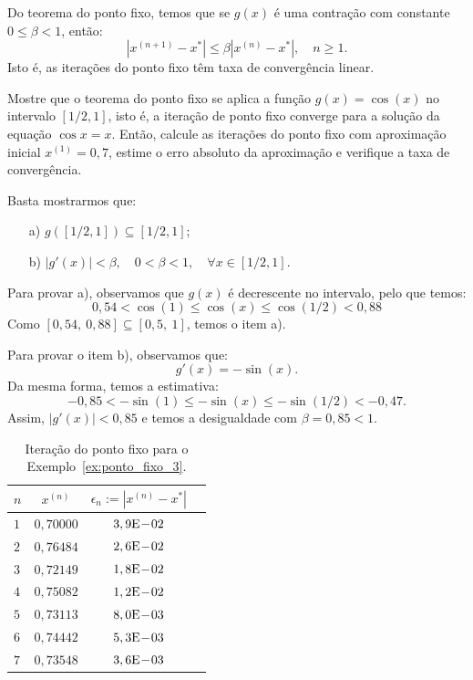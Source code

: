 \begin{ex}
\begin{obs}
  Do teorema do ponto fixo, temos que se $g(x)$ é uma contração com constante $0\leq \beta < 1$, então:
  \begin{equation}
    |x^{(n+1)}-x^*| \leq \beta |x^{(n)}-x^*|,\quad n\geq 1.
  \end{equation}
Isto é, as iterações do ponto fixo têm taxa de convergência linear.
\end{obs}

\begin{ex}\label{ex:ponto_fixo_3}
Mostre que o teorema do ponto fixo se aplica a função $g(x) = \cos(x)$ no intervalo $[1/2, 1]$, isto é, a iteração de ponto fixo converge para a solução da equação $\cos x = x$. Então, calcule as iterações do ponto fixo com aproximação inicial $x^{(1)} = 0,7$, estime o erro absoluto da aproximação e verifique a taxa de convergência.
\end{ex}
\begin{sol}
  Basta mostrarmos que:
  \begin{enumerate}
  \item[a)] $g\left([1/2,1]\right) \subseteq [1/2,1]$;
  \item[b)] $|g'(x)|<\beta, \quad 0<\beta<1,\quad \forall x\in [1/2,1]$.
  \end{enumerate}

Para provar a), observamos que $g(x)$ é decrescente no intervalo, pelo que temos:
\begin{equation}
  0,54<\cos(1)\leq \cos(x)\leq \cos(1/2)<0,88
\end{equation}
Como $[0,54,~0,88]\subseteq [0,5,~1]$, temos o item a).

Para provar o item b), observamos que:
\begin{equation}
  g'(x) = -\sin(x).
\end{equation}
Da mesma forma, temos a estimativa:
\begin{equation}
  -0,85<-\sin(1) \leq -\sin(x)\leq -\sin(1/2)<-0,47.
\end{equation}
Assim, $|g'(x)|<0,85$ e temos a desigualdade com $\beta=0,85<1$.

\begin{table}
  \centering
  \begin{tabular}{l|ccc}\hline
   $n$ & $x^{(n)}$ & $\epsilon_n := |x^{(n)} - x^*|$ \\\hline
   $1$ & $0,70000$ & $3,9\mathrm{E}\!-\!02$ \\
   $2$ & $0,76484$ & $2,6\mathrm{E}\!-\!02$ \\
   $3$ & $0,72149$ & $1,8\mathrm{E}\!-\!02$ \\
   $4$ & $0,75082$ & $1,2\mathrm{E}\!-\!02$ \\
   $5$ & $0,73113$ & $8,0\mathrm{E}\!-\!03$ \\
   $6$ & $0,74442$ & $5,3\mathrm{E}\!-\!03$ \\
   $7$ & $0,73548$ & $3,6\mathrm{E}\!-\!03$ \\\hline
  \end{tabular}
  \caption{Iteração do ponto fixo para o Exemplo~\ref{ex:ponto_fixo_3}.}
  \label{tab:ponto_fixo_3}
\end{table}



\end{sol}
\end{ex}
